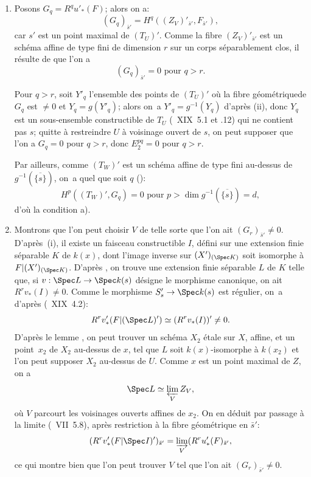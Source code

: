 \begin{enumerate}
\item[$1^\circ)$]
Posons $G_q = R^q u'_*(F)$; alors on a:
$$(G_q)_{\bar{s}'}=H^q((Z_V)'_{\bar{s}'}, F_{\bar{s}'}),
$$
car $s'$ est un point maximal de $(T_U)'$. Comme la fibre $(Z_V)'_{\bar{s}'}$ est un sch\'ema affine de type fini de dimension $r$ sur un corps s\'eparablement clos, il r\'esulte de  que l'on a
$$(G_q)_{\bar{s}'}=0 \text{ pour } q>r.
$$

Pour $q>r$, soit $Y'_q$ l'ensemble des points de $(T_U)'$ o\`u la fibre g\'eom\'etrique\pageoriginale de $G_q$ est $\neq 0$ et $Y_q=g(Y'_q)$; alors on~a $Y'_q = g^{-1}(Y_q)$ d'apr\`es \textup{(ii)}, donc $Y_q$ est un sous-ensemble constructible de $T_U$ (~XIX~5.1 et .12) qui ne contient pas $s$; quitte \`a restreindre $U$ \`a voisinage ouvert de $s$, on peut supposer que l'on a $G_q=0$ pour $q>r$, donc $E_2^{pq}=0$ pour $q>r$.

Par ailleurs, comme $(T_W)'$ est un sch\'ema affine de type fini au-dessus de $g^{-1}(\overline{\{s\}})$, on~a quel que soit $q$ (\cf {}):
$$H^p((T_W)', G_q)=0 \text{ pour } p>\dim g^{-1}(\overline{\{s\}})=d,
$$
d'o\`u la condition a).

\item[$2^\circ)$]
Montrons que l'on peut choisir $V$ de telle sorte que l'on ait $(G_r)_{\bar{s}'} \neq 0$. D'apr\`es~\textup{(i)}, il existe un faisceau constructible $I$, d\'efini sur une extension finie s\'eparable $K$ de $k(x)$, dont l'image inverse sur $(X')_{(\Spec K)}$ soit isomorphe \`a $F{|(X')_{(\Spec K)}}$. D'apr\`es , on trouve une extension finie s\'eparable $L$ de $K$ telle que, si $v:\Spec L \to \Spec k(s)$ d\'esigne le morphisme canonique, on ait $R^r v_*(I) \neq 0$. Comme le morphisme $S'_s \to \Spec k(s)$ est r\'egulier, on~a d'apr\`es (~XIX~4.2):
$$R^rv_*'(F{|(\Spec L)'}) \simeq (R^rv_*(I))' \neq 0.
$$
D'apr\`es le lemme , on peut trouver un sch\'ema $X_2$ \'etale sur $X$, affine, et un point~$x_2$ de $X_2$ au-dessus de $x$, tel que $L$ soit $k(x)$-isomorphe \`a $k(x_2)$ et l'on peut supposer $X_2$ au-dessus de $U$. Comme $x$ est un point maximal de $Z$, on a\pageoriginale
$$
\Spec L \simeq \varprojlim_V Z_V,
$$
o\`u $V$ parcourt les voisinages ouverts affines de $x_2$. On en d\'eduit par passage \`a la limite (~VII~5.8), apr\`es restriction \`a la fibre g\'eom\'etrique en $\bar{s}'$:
$$
(R^rv_*'(F{|\Spec I})')_{\bar{s}'} = \varinjlim_V (R^ru_*'(F)_{\bar{s}'},
$$
ce qui montre bien que l'on peut trouver $V$ tel que l'on ait $(G_r)_{\bar{s}'} \neq 0$.


\end{enumerate}
